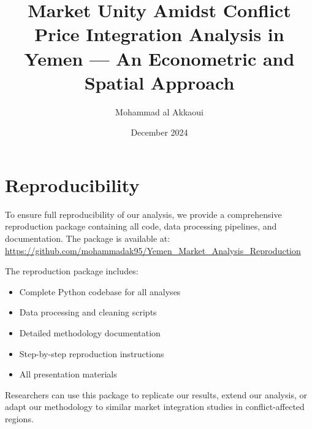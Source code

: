 \documentclass[11pt]{article}
\title{\huge Market Unity Amidst Conflict\\[0.5em]
\large Price Integration Analysis in Yemen \hspace{1em}---\hspace{1em} An Econometric and Spatial Approach}
\author{Mohammad al Akkaoui}
\date{December 2024}
\begin{document}
\maketitle









\section*{Reproducibility}
To ensure full reproducibility of our analysis, we provide a comprehensive reproduction package containing all code, data processing pipelines, and documentation. The package is available at: \url{https://github.com/mohammadak95/Yemen_Market_Analysis_Reproduction}

The reproduction package includes:
\begin{itemize}
    \item Complete Python codebase for all analyses
    \item Data processing and cleaning scripts
    \item Detailed methodology documentation
    \item Step-by-step reproduction instructions
    \item All presentation materials
\end{itemize}

Researchers can use this package to replicate our results, extend our analysis, or adapt our methodology to similar market integration studies in conflict-affected regions.

\clearpage

\end{document}
